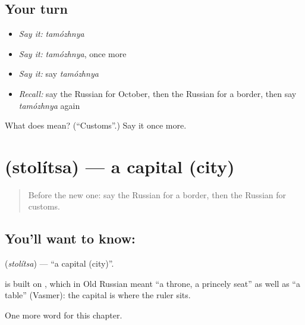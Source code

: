 \subsection*{Your turn}
\begin{itemize}
\raggedright
  \item \emph{Say it:} \emph{tamózhnya}
  \item \emph{Say it:} \emph{tamózhnya}, once more
  \item \emph{Say it:} say \emph{tamózhnya}
  \item \emph{Recall:} say the Russian for October, then the Russian for a border, then say \emph{tamózhnya} again
\end{itemize}

\begin{tcolorbox}[breakable,colback=teal!4,colframe=teal!35!black,title={Before you move on}]
What does  mean? (\textquotedblleft{}Customs\textquotedblright{}.) Say it once more.
\end{tcolorbox}
\section[\texorpdfstring{\ru{столица} (stolítsa)}{столица (stolítsa)}]{ (stolítsa) — a capital (city)}

\label{lesson:RU-C213-stolitsa}



\begin{quote}
Before the new one: say the Russian for a border, then the Russian for customs.
\end{quote}

\subsection*{You'll want to know: }
\textbf{} (\emph{stolítsa}) — \textquotedblleft{}a capital (city)\textquotedblright{}.

\begin{cousinweb}
\textbf{} is built on \emph{}, which in Old Russian meant \textquotedblleft{}a throne, a princely seat\textquotedblright{} as well as \textquotedblleft{}a table\textquotedblright{} (Vasmer): the capital is where the ruler sits.
\end{cousinweb}

\begin{grammarlens}[title={What you've built}]
One more word for this chapter.
\end{grammarlens}

